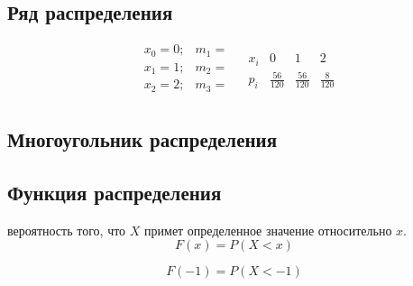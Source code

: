     \subsection{Ряд распределения}
        \begin{equation}
            \begin{align*}
                &x_{0} = 0 ; &m_{1} = \\
                &x_{1} = 1 ; &m_{2} = \\
                &x_{2} = 2 ; &m_{3} = \\
            \end{align*}

            \begin{align*}
                &x_{i} &0 &1 &2\\
                &p_{i} &\frac{56}{120} &\frac{56}{120} &\frac{8}{120}
            \end{align*}
        \end{equation}

    \subsection{Многоугольник распределения}

    \subsection{Функция распределения}    
        вероятность того, что \(X\) примет определенное значение относительно \(x\).
        \begin{equation}
            F(x) = P(X < x)
        \end{equation}
        \begin{ex}
            \begin{equation}
                F(-1) = P(X < -1)
            \end{equation}
        \end{ex}

